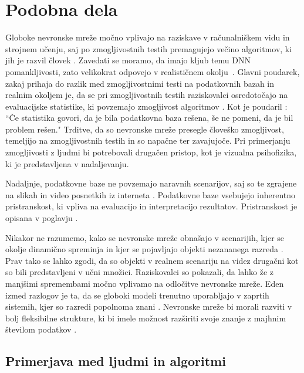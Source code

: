 \chapter{Podobna dela}
Globoke nevronske mreže močno vplivajo na raziskave v računalniškem vidu in strojnem učenju, saj po zmogljivostnih testih premagujejo večino algoritmov, ki jih je razvil človek \cite{sunderhauf2018the}. Zavedati se moramo, da imajo kljub temu DNN pomankljivosti, zato velikokrat odpovejo v realističnem okolju~\cite{sunderhauf2018the}. Glavni poudarek, zakaj prihaja do razlik med zmogljivostnimi testi na podatkovnih bazah in realnim okoljem je, da se pri zmogljivostnih testih raziskovalci osredotočajo na evaluacijske statistike, ki povzemajo zmogljivost algoritmov \cite{sunderhauf2018the}. Kot je poudaril : ``Če statistika govori, da je bila podatkovna baza rešena, še ne pomeni, da je bil problem rešen." Trditve, da so nevronske mreže presegle človeško zmogljivost, temeljijo na zmogljivostnih testih in so napačne ter zavajujoče. Pri primerjanju zmogljivosti z ljudmi bi potrebovali drugačen pristop, kot je vizualna psihofizika, ki je predstavljena v nadaljevanju. 


Nadaljnje, podatkovne baze ne povzemajo naravnih scenarijov, saj so te zgrajene na slikah in video posnetkih iz interneta \cite{sunderhauf2018the}. Podatkovne baze vsebujejo inherentno pristranskost, ki vpliva na evaluacijo in interpretacijo rezultatov. Pristranskost je opisana v poglavju .


Nikakor ne razumemo, kako se nevronske mreže obnašajo v scenarijih, kjer se okolje dinamično spreminja in kjer se pojavljajo objekti nezananega razreda \cite{sunderhauf2018the}. Prav tako se lahko zgodi, da so objekti v realnem scenariju na videz drugačni kot so bili predstavljeni v učni množici. Raziskovalci so pokazali, da lahko že z manjšimi spremembami močno vplivamo na odločitve nevronske mreže. Eden izmed razlogov je ta, da se globoki modeli trenutno uporabljajo v zaprtih sistemih, kjer so razredi popolnoma znani \cite{sunderhauf2018the}. Nevronske mreže bi morali razviti v bolj fleksibilne strukture, ki bi imele možnost razširiti svoje znanje z majhnim številom podatkov \cite{sunderhauf2018the}. %


\section{Primerjava med ljudmi in algoritmi}
